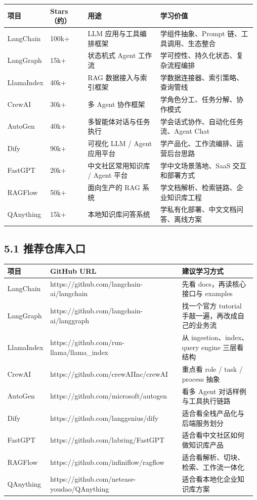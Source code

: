 \begingroup
\scriptsize
\setlength{\tabcolsep}{3pt}
\begin{longtable}{|p{}|p{}|p{}|p{}|}
\hline
项目 & Stars（约） & 用途 & 学习价值 \\ \hline
LangChain & 100k+ & LLM 应用与工具编排框架 & 学组件抽象、Prompt 链、工具调用、生态整合 \\ \hline
LangGraph & 15k+ & 状态机式 Agent 工作流 & 学可控性、持久化状态、复杂流程编排 \\ \hline
LlamaIndex & 40k+ & RAG 数据接入与索引框架 & 学数据连接器、索引策略、查询管线 \\ \hline
CrewAI & 30k+ & 多 Agent 协作框架 & 学角色分工、任务分解、协作模式 \\ \hline
AutoGen & 40k+ & 多智能体对话与任务执行 & 学会话式协作、自动化任务流、Agent Chat \\ \hline
Dify & 90k+ & 可视化 LLM / Agent 应用平台 & 学产品化、工作流编排、运营后台思路 \\ \hline
FastGPT & 20k+ & 中文社区常用知识库 / Agent 平台 & 学中文场景落地、SaaS 交互和部署方式 \\ \hline
RAGFlow & 50k+ & 面向生产的 RAG 系统 & 学文档解析、检索链路、企业知识库工程 \\ \hline
QAnything & 15k+ & 本地知识库问答系统 & 学私有化部署、中文文档问答、离线方案 \\ \hline
\end{longtable}
\endgroup

\subsection{5.1 推荐仓库入口}

\begingroup
\scriptsize
\setlength{\tabcolsep}{3pt}
\begin{longtable}{|p{}|p{}|p{}|}
\hline
项目 & GitHub URL & 建议学习方式 \\ \hline
LangChain & https://github.com/langchain-ai/langchain & 先看 docs，再读核心接口与 examples \\ \hline
LangGraph & https://github.com/langchain-ai/langgraph & 找一个官方 tutorial 手敲一遍，再改成自己的业务流 \\ \hline
LlamaIndex & https://github.com/run-llama/llama\_index & 从 ingestion、index、query engine 三层看结构 \\ \hline
CrewAI & https://github.com/crewAIInc/crewAI & 重点看 role / task / process 抽象 \\ \hline
AutoGen & https://github.com/microsoft/autogen & 看多 Agent 对话样例与工具执行链路 \\ \hline
Dify & https://github.com/langgenius/dify & 适合看全栈产品化与后端服务划分 \\ \hline
FastGPT & https://github.com/labring/FastGPT & 适合看中文社区如何做知识库产品 \\ \hline
RAGFlow & https://github.com/infiniflow/ragflow & 适合看解析、切块、检索、工作流一体化 \\ \hline
QAnything & https://github.com/netease-youdao/QAnything & 适合看本地化企业知识库方案 \\ \hline
\end{longtable}
\endgroup

